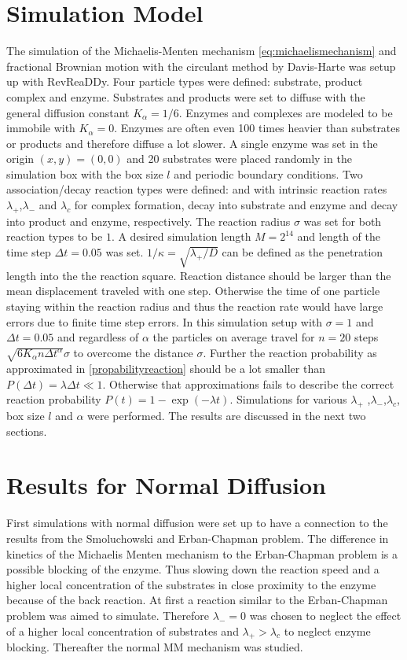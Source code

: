 \documentclass[
  a4paper,BCOR10mm,oneside,
  headsepline,footsepline,%
  fleqn,openbib
]{scrbook}
\begin{document}
\section{Simulation Model}
The simulation of the Michaelis-Menten mechanism \cref{eq:michaelismechanism} and fractional Brownian motion with the circulant method by Davis-Harte \cite{Dieker2004} was setup up with RevReaDDy. Four particle types were defined: substrate, product complex and enzyme. Substrates and products were set to diffuse with the general diffusion constant $K_{\alpha}=1/6 $. Enzymes and complexes are modeled to be immobile with $K_{\alpha}=0$. Enzymes are often even 100 times heavier than substrates or products and therefore diffuse a lot slower.  A single enzyme was set in the origin $(x,y)=(0,0)$ and 20 substrates were placed randomly in the simulation box with the box size $l$ and periodic boundary conditions. Two association/decay reaction types were defined:   and  with intrinsic reaction rates $\lambda_+$,$\lambda_-$ and $\lambda_c$ for complex formation, decay into substrate and enzyme and decay into product and enzyme, respectively. The reaction radius $\sigma $ was set for both reaction types to be $1$. A desired simulation length $M=2^{14}$ and length of the time step $\Delta t=0.05$ was set. $1/\kappa= \sqrt{\lambda_+/D}$ can be defined as the penetration length into the the reaction square. Reaction distance should be larger than the mean displacement traveled with one step. Otherwise the time of one particle staying within the reaction radius and thus the reaction rate would have large errors due to finite time step errors. In this simulation setup with $\sigma =1 $ and $\Delta t=0.05$  and regardless of $\alpha$ the particles on average travel for $n=20$ steps $\sqrt{6K_{\alpha} n \Delta t^{\alpha}} \sigma$ to overcome the distance $\sigma$. Further the reaction probability  as approximated in \cref{propabilityreaction} should be a lot smaller than  $P(\Delta t)=\lambda \Delta t \ll 1$. Otherwise that approximations fails to describe the correct reaction probability $P(t)=1-\exp(-\lambda t)$. Simulations for various $\lambda_+$ ,$\lambda_-$,$\lambda_c$, box size $l$ and $\alpha$ were performed. The results are discussed in the next two sections.
\section{Results for Normal Diffusion}
First simulations with normal diffusion were set up to have a connection to the results from the Smoluchowski and Erban-Chapman problem. The difference in kinetics of the Michaelis Menten mechanism to the Erban-Chapman problem is a possible blocking of the enzyme. Thus slowing down the reaction speed and a higher local concentration of the substrates in close proximity to the enzyme because of the back reaction. At first  a reaction similar to the Erban-Chapman problem was aimed to simulate. Therefore  $\lambda_-=0$  was chosen to neglect the effect of a higher local concentration of substrates and $\lambda_+>\lambda_c$ to neglect enzyme blocking. Thereafter the normal MM mechanism was studied. 
\end{document}
